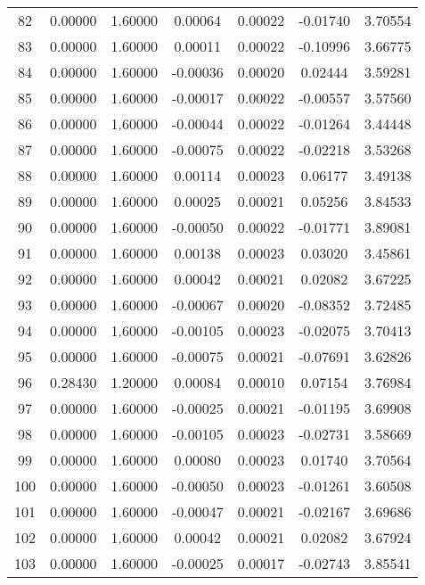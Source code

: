 \begin{longtable}{c c c c c c c}
82  &  0.00000 &      1.60000 &  0.00064 &   0.00022 &  -0.01740 &   3.70554 \\
83  &  0.00000 &      1.60000 &  0.00011 &   0.00022 &  -0.10996 &   3.66775 \\
84  &  0.00000 &      1.60000 & -0.00036 &   0.00020 &   0.02444 &   3.59281 \\
85  &  0.00000 &      1.60000 & -0.00017 &   0.00022 &  -0.00557 &   3.57560 \\
86  &  0.00000 &      1.60000 & -0.00044 &   0.00022 &  -0.01264 &   3.44448 \\
87  &  0.00000 &      1.60000 & -0.00075 &   0.00022 &  -0.02218 &   3.53268 \\
88  &  0.00000 &      1.60000 &  0.00114 &   0.00023 &   0.06177 &   3.49138 \\
89  &  0.00000 &      1.60000 &  0.00025 &   0.00021 &   0.05256 &   3.84533 \\
90  &  0.00000 &      1.60000 & -0.00050 &   0.00022 &  -0.01771 &   3.89081 \\
91  &  0.00000 &      1.60000 &  0.00138 &   0.00023 &   0.03020 &   3.45861 \\
92  &  0.00000 &      1.60000 &  0.00042 &   0.00021 &   0.02082 &   3.67225 \\
93  &  0.00000 &      1.60000 & -0.00067 &   0.00020 &  -0.08352 &   3.72485 \\
94  &  0.00000 &      1.60000 & -0.00105 &   0.00023 &  -0.02075 &   3.70413 \\
95  &  0.00000 &      1.60000 & -0.00075 &   0.00021 &  -0.07691 &   3.62826 \\
96  &  0.28430 &      1.20000 &  0.00084 &   0.00010 &   0.07154 &   3.76984 \\
97  &  0.00000 &      1.60000 & -0.00025 &   0.00021 &  -0.01195 &   3.69908 \\
98  &  0.00000 &      1.60000 & -0.00105 &   0.00023 &  -0.02731 &   3.58669 \\
99  &  0.00000 &      1.60000 &  0.00080 &   0.00023 &   0.01740 &   3.70564 \\
100 &  0.00000 &      1.60000 & -0.00050 &   0.00023 &  -0.01261 &   3.60508 \\
101 &  0.00000 &      1.60000 & -0.00047 &   0.00021 &  -0.02167 &   3.69686 \\
102 &  0.00000 &      1.60000 &  0.00042 &   0.00021 &   0.02082 &   3.67924 \\
103 &  0.00000 &      1.60000 & -0.00025 &   0.00017 &  -0.02743 &   3.85541 \\

\end{longtable}

